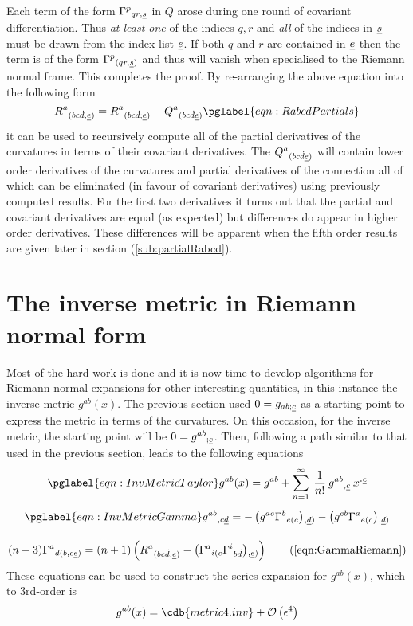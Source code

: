 \documentclass[a4paper,12pt]{article}
\numberwithin{equation}{section}
\begin{document}
Each term of the form $\Gamma^{p}{}_{qr,\us}$ in $Q$ arose during one round of covariant
differentiation. Thus \emph{at least one} of the indices $q,r$ and \emph{all} of the indices
in $\us$ must be drawn from the index list $\ue$. If both $q$ and $r$ are contained in $\ue$
then the term is of the form $\Gamma^{p}{}_{(qr,\us)}$ and thus will vanish when specialised
to the Riemann normal frame. This completes the proof. By re-arranging the above equation
into the following form
\begin{equation}
R^{a}{}_{(bc{\Dot d},\ue)} = R^{a}{}_{(bc{\Dot d};\ue)} - Q^{a}{}_{(bc{\Dot d}\ue)}
\pglabel{eqn:RabcdPartials}
\end{equation}
it can be used to recursively compute all of the partial derivatives of the curvatures in
terms of their covariant derivatives. The $Q^{a}{}_{(bc{\Dot d}\ue)}$ will contain lower
order derivatives of the curvatures and partial derivatives of the connection all of which
can be eliminated (in favour of covariant derivatives) using previously computed results.
For the first two derivatives it turns out that the partial and covariant derivatives are
equal (as expected) but differences do appear in higher order derivatives. These differences
will be apparent when the fifth order results are given later in section
(\ref{sub:partialRabcd}).

\section{The inverse metric in Riemann normal form}\label{sec:InvMetricRNC}

Most of the hard work is done and it is now time to develop algorithms for Riemann normal
expansions for other interesting quantities, in this instance the inverse metric
$g^{ab}(x)$. The previous section used $0=g_{ab;\uc}$ as a starting point to express the
metric in terms of the curvatures. On this occasion, for the inverse metric, the starting
point will be $0=g^{ab}{}_{;\uc}$. Then, following a path similar to that used in the
previous section, leads to the following equations
\begin{gather}
\pglabel{eqn:InvMetricTaylor}
g^{ab}(x) = g^{ab} + \sum_{n=1}^\infty\> \frac{1}{n!}\>g^{ab}{}_{,\uc}\>x^{\Xdot\uc}\\[5pt]
\pglabel{eqn:InvMetricGamma}
g^{ab}{}_{,c\ud} = - \left(g^{ae}\Gamma^{b}{}_{e(c}\right){}_{\!,\ud)}
                   - \left(g^{eb}\Gamma^{a}{}_{e(c}\right){}_{\!,\ud)}\\[10pt]
(n+3)\Gamma^a{}_{d(b,c\ue)} =
        (n+1)\left( R^a{}_{(bc\Dot d,\ue)}
                   - \left(\Gamma^a{}_{i(c}\Gamma^i{}_{b{\Dot d}}\right){}_{\!,\ue)}
              \right)\tag{\ref{eqn:GammaRiemann}}
\end{gather}
These equations can be used to construct the series expansion for $g^{ab}(x)$, which to
3rd-order is
%
\begin{dmath*}g^{ab}(x) = \cdb{metric4.inv} + \BigO{\eps^4}\end{dmath*}
%
\end{document}

